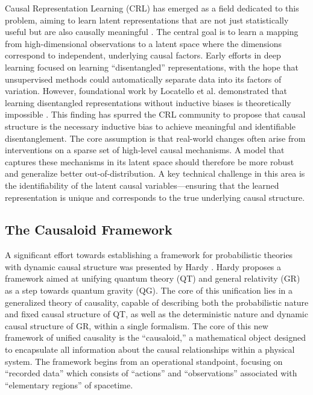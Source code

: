 {Causal Representation Learning (CRL) has emerged as a field dedicated to this problem, aiming to learn latent representations that are not just statistically useful but are also causally meaningful \cite{Scholkopf2021Toward}. The central goal is to learn a mapping from high-dimensional observations to a latent space where the dimensions correspond to independent, underlying causal factors.
Early efforts in deep learning focused on learning ``disentangled'' representations, with the hope that unsupervised methods could automatically separate data into its factors of variation. However, foundational work by Locatello et al. demonstrated that learning disentangled representations without inductive biases is theoretically impossible \cite{Locatello2019Challenging}. This finding has spurred the CRL community to propose that causal structure is the necessary inductive bias to achieve meaningful and identifiable disentanglement. The core assumption is that real-world changes often arise from interventions on a sparse set of high-level causal mechanisms. A model that captures these mechanisms in its latent space should therefore be more robust and generalize better out-of-distribution. A key technical challenge in this area is the identifiability of the latent causal variables—ensuring that the learned representation is unique and corresponds to the true underlying causal structure. 

\subsection{The Causaloid Framework}

A significant effort towards establishing a framework for probabilistic theories with dynamic causal structure was presented by Hardy \cite{hardy2005probability}. Hardy proposes a framework aimed at unifying quantum theory (QT) and general relativity (GR) as a step towards quantum gravity (QG). The core of this unification lies in a generalized theory of causality, capable of describing both the probabilistic nature and fixed causal structure of QT, as well as the deterministic nature and dynamic causal structure of GR, within a single formalism. The core of this new framework of unified causality is the ``causaloid,'' a mathematical object designed to encapsulate all information about the causal relationships within a physical system. The framework begins from an operational standpoint, focusing on ``recorded data'' which consists of ``actions'' and ``observations'' associated with ``elementary regions'' of spacetime.

}
